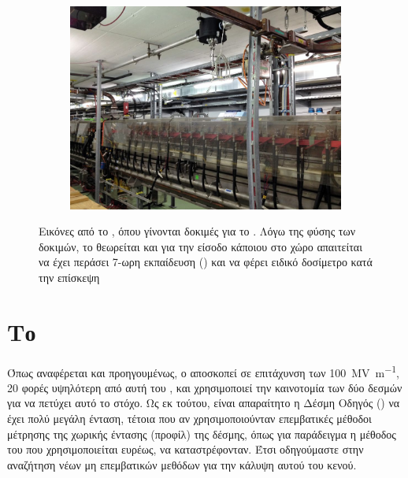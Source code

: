 \begin{figure}[h]
\begin{subfigure}{0.5\textwidth}
    \end{subfigure}        
	~
    \begin{subfigure}{0.5\textwidth}
		\centering
		\includegraphics[width=.9\linewidth]{images/CLIC-CTF3-img4.jpg}
    \end{subfigure}
    
\caption[Εικόνες από το ]{Εικόνες από το , όπου γίνονται δοκιμές για το . Λόγω της φύσης των δοκιμών, το  θεωρείται  και για την είσοδο κάποιου στο χώρο απαιτείται να έχει περάσει 7-ωρη εκπαίδευση () και να φέρει ειδικό δοσίμετρο κατά την επίσκεψη}
\label{img:CLIC-CTF3}        
\end{figure}

\section{Το }

Όπως αναφέρεται και προηγουμένως, ο  αποσκοπεί σε επιτάχυνση των \SI[per-mode = symbol]{100}{\mega \volt \per \metre}, 20 φορές υψηλότερη από αυτή του , και χρησιμοποιεί την καινοτομία των δύο δεσμών για να πετύχει αυτό το στόχο. 
Ως εκ τούτου, είναι απαραίτητο η Δέσμη Οδηγός () να έχει πολύ μεγάλη ένταση, τέτοια που αν χρησιμοποιούνταν επεμβατικές μέθοδοι μέτρησης της χωρικής έντασης (προφίλ) της δέσμης, όπως για παράδειγμα η μέθοδος του  που χρησιμοποιείται ευρέως, να καταστρέφονταν.
Έτσι οδηγούμαστε στην αναζήτηση νέων μη επεμβατικών μεθόδων για την κάλυψη αυτού του κενού.


